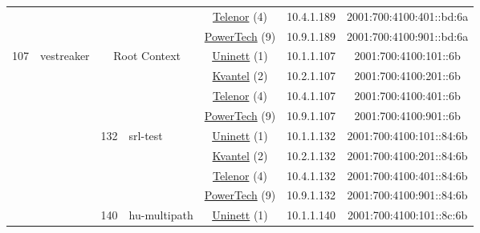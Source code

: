 \begin{small}
\begin{center}
\begin{longtable}{|c|c|c|c|c|c|c|c|}
  &  &  &  & \multicolumn{2}{|c|}{\tiny{\href{https://www.telenor.no}{Telenor} (4)}} & \tiny{10.4.1.189} & \tiny{2001:700:4100:401::bd:6a} \\* \cline{5-5}\cline{6-6}\cline{7-7}\cline{8-8}
  &  &  &  & \multicolumn{2}{|c|}{\tiny{\href{http://www.powertech.no}{PowerTech} (9)}} & \tiny{10.9.1.189} & \tiny{2001:700:4100:901::bd:6a} \\ \hline
 \multirow{24}{*}{\tiny{107}} & \multicolumn{1}{|l|}{\multirow{24}{*}{\tiny{vestreaker}}} & \multicolumn{2}{|c|}{\multirow{4}{*}{\tiny{Root Context}}} & \multicolumn{2}{|c|}{\tiny{\href{https://www.uninett.no}{Uninett} (1)}} & \tiny{10.1.1.107} & \tiny{2001:700:4100:101::6b} \\* \cline{5-5}\cline{6-6}\cline{7-7}\cline{8-8}
  &  & \multicolumn{2}{|c|}{} & \multicolumn{2}{|c|}{\tiny{\href{http://kvantel.no}{Kvantel} (2)}} & \tiny{10.2.1.107} & \tiny{2001:700:4100:201::6b} \\* \cline{5-5}\cline{6-6}\cline{7-7}\cline{8-8}
  &  & \multicolumn{2}{|c|}{} & \multicolumn{2}{|c|}{\tiny{\href{https://www.telenor.no}{Telenor} (4)}} & \tiny{10.4.1.107} & \tiny{2001:700:4100:401::6b} \\* \cline{5-5}\cline{6-6}\cline{7-7}\cline{8-8}
  &  & \multicolumn{2}{|c|}{} & \multicolumn{2}{|c|}{\tiny{\href{http://www.powertech.no}{PowerTech} (9)}} & \tiny{10.9.1.107} & \tiny{2001:700:4100:901::6b} \\* \cline{3-3}\cline{4-4}\cline{5-5}\cline{6-6}\cline{7-7}\cline{8-8}
  &  & \multirow{4}{*}{\tiny{132}} & \multicolumn{1}{|l|}{\multirow{4}{*}{\tiny{srl-test}}} & \multicolumn{2}{|c|}{\tiny{\href{https://www.uninett.no}{Uninett} (1)}} & \tiny{10.1.1.132} & \tiny{2001:700:4100:101::84:6b} \\* \cline{5-5}\cline{6-6}\cline{7-7}\cline{8-8}
  &  &  &  & \multicolumn{2}{|c|}{\tiny{\href{http://kvantel.no}{Kvantel} (2)}} & \tiny{10.2.1.132} & \tiny{2001:700:4100:201::84:6b} \\* \cline{5-5}\cline{6-6}\cline{7-7}\cline{8-8}
  &  &  &  & \multicolumn{2}{|c|}{\tiny{\href{https://www.telenor.no}{Telenor} (4)}} & \tiny{10.4.1.132} & \tiny{2001:700:4100:401::84:6b} \\* \cline{5-5}\cline{6-6}\cline{7-7}\cline{8-8}
  &  &  &  & \multicolumn{2}{|c|}{\tiny{\href{http://www.powertech.no}{PowerTech} (9)}} & \tiny{10.9.1.132} & \tiny{2001:700:4100:901::84:6b} \\* \cline{3-3}\cline{4-4}\cline{5-5}\cline{6-6}\cline{7-7}\cline{8-8}
  &  & \multirow{4}{*}{\tiny{140}} & \multicolumn{1}{|l|}{\multirow{4}{*}{\tiny{hu-multipath}}} & \multicolumn{2}{|c|}{\tiny{\href{https://www.uninett.no}{Uninett} (1)}} & \tiny{10.1.1.140} & \tiny{2001:700:4100:101::8c:6b} \\* \cline{5-5}\cline{6-6}\cline{7-7}\cline{8-8}

\end{longtable}
\end{center}
\end{small}
